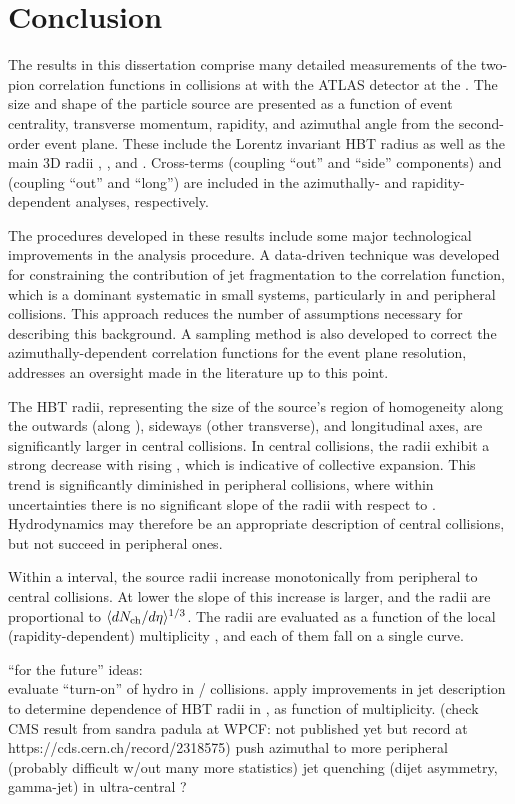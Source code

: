 \chapter{Conclusion}
\label{ch:conclusion}

The results in this dissertation comprise many detailed measurements of the two-pion correlation functions in \pPb collisions at \pPbenergy with the ATLAS detector at the \lhc.
The size and shape of the particle source are presented as a function of event centrality, transverse momentum, rapidity, and azimuthal angle from the second-order event plane.
These include the Lorentz invariant HBT radius \Rinv as well as the main 3D radii \Rout, \Rside, and \Rlong.
Cross-terms \Ros (coupling ``out'' and ``side'' components) and \Rol (coupling ``out'' and ``long'') are included in the azimuthally- and rapidity-dependent analyses, respectively.

The procedures developed in these results include some major technological improvements in the analysis procedure.
A data-driven technique was developed for constraining the contribution of jet fragmentation to the correlation function, which is a dominant systematic in small systems, particularly in \pp and peripheral \pA collisions.
This approach reduces the number of assumptions necessary for describing this background.
A sampling method is also developed to correct the azimuthally-dependent correlation functions for the event plane resolution, addresses an oversight made in the literature up to this point.

The HBT radii, representing the size of the source's region of homogeneity along the outwards (along \kt), sideways (other transverse), and longitudinal axes, are significantly larger in central collisions.
In central collisions, the radii exhibit a strong decrease with rising \kt, which is indicative of collective expansion.
This trend is significantly diminished in peripheral collisions, where within uncertainties there is no significant slope of the radii with respect to \kt.
Hydrodynamics may therefore be an appropriate description of central \pPb collisions, but not succeed in peripheral ones.

Within a \kt interval, the source radii increase monotonically from peripheral to central collisions.
At lower \kt the slope of this increase is larger, and the radii are proportional to \(\langle d\mbox{$N_{\mathrm{ch}}$}/d\eta\rangle^{1/3}\).
The radii are evaluated as a function of the local (rapidity-dependent) multiplicity \dNdy, and each of them fall on a single curve.



``for the future'' ideas:\\
evaluate ``turn-on'' of hydro in \pPb / \pp collisions.
apply improvements in jet description to determine \kt dependence of HBT radii in \pp, as function of multiplicity. (check CMS result from sandra padula at WPCF: not published yet but record at https://cds.cern.ch/record/2318575)
push azimuthal to more peripheral (probably difficult w/out many more statistics)
jet quenching (dijet asymmetry, gamma-jet) in ultra-central \pPb?

